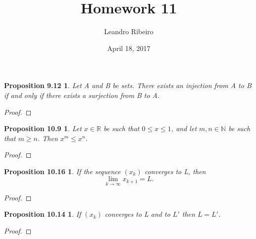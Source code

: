 \documentclass[12pt]{amsart}
\newcommand{\N}{\mathbb{N}}
\newcommand{\R}{\mathbb{R}}
\begin{document}
\title{Homework 11}
\date{April 18, 2017}
\author{Leandro Ribeiro}

\maketitle

\newtheorem*{prop9.12}{Proposition 9.12}

\begin{prop9.12}
	Let A and B be sets. There exists an injection from A to B if and only if there exists a surjection from B to A.
\end{prop9.12}
\begin{proof}
\end{proof}

\newtheorem*{prop10.9}{Proposition 10.9}
\begin{prop10.9}
	Let $x \in \R$ be such that $0 \leq x \leq 1$, and let $m, n \in \N$ be such that $m \geq n$. Then $x^{m} \leq x^{n}$.
\end{prop10.9}

\begin{proof}
\end{proof}

\newtheorem*{prop10.16}{Proposition 10.16}
\begin{prop10.16}
	If the sequence $(x_k)$ converges to L, then $$\lim_{k \to \infty} x_{k+1} = L.$$
\end{prop10.16}

\begin{proof}
\end{proof}

\newtheorem*{prop10.14}{Proposition 10.14}
\begin{prop10.14}
	If $(x_k)$ converges to L and to $L'$ then $L = L'$.
\end{prop10.14}

\begin{proof}
\end{proof}
\end{document}
